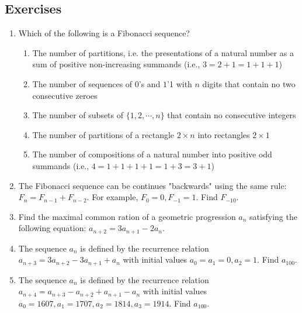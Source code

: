 \subsection{Exercises}

\begin{enumerate}
\item Which of the following is a Fibonacci sequence?
\begin{enumerate}
\item The number of partitions, i.e. the presentations of a natural number as a sum of positive non-increasing summands (i.e., $3=2+1=1+1+1$)
\item The number of sequences of $0$'s and $1$'1 with $n$ digits that contain no two consecutive zeroes
\item The number of subsets of $\{1,2, \cdots, n\}$ that contain no consecutive integers
\item The number of partitions of a rectangle $2 \times n$ into rectangles $2 \times 1$
\item The number of compositions of a natural number into positive odd summands (i.e., $4=1+1+1+1=1+3=3+1$)
\end{enumerate}
\item The Fibonacci sequence can be continues "backwards" using the same rule: $F_n=F_{n-1}+F_{n-2}$. For example, $F_0=0, F_{-1}=1$. Find $F_{-10}$.
\item Find the maximal common ration of a geometric progression $a_n$ satisfying the following equation: $a_{n+2}=3a_{n+1}-2a_n$.
\item The sequence $a_n$ is defined by the recurrence relation $a_{n+3}=3a_{n+2}-3a_{n+1}+a_n$ with initial values $a_0=a_1=0, a_2=1$. Find $a_{100}$.
\item The sequence $a_n$ is defined by the recurrence relation $a_{n+4}=a_{n+3}-a_{n+2}+a_{n+1}-a_n$ with initial values $a_0=1607, a_1=1707, a_2=1814, a_3=1914$. Find $a_{100}$.
\end{enumerate}